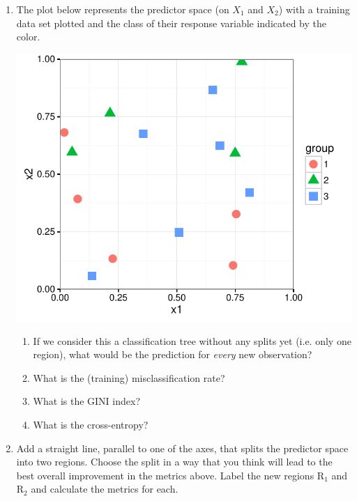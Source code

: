 \documentclass{article}\usepackage[]{graphicx}\usepackage[]{color}
\begin{document}
\begin{enumerate}
\setlength\itemsep{4em}

\item The plot below represents the predictor space (on $X_1$ and $X_2$) with a training data set plotted and the class of their response variable indicated by the color.

\begin{minipage}{.5\linewidth}
{\includegraphics[scale=0.6]{3-class-plot}}
\end{minipage}
\begin{minipage}{.5\linewidth}

\begin{enumerate}
\setlength\itemsep{3em}
\item If we consider this a classification tree without any splits yet (i.e. only one region), what would be the prediction for \emph{every} new observation?
\item What is the (training) misclassification rate?
\item What is the GINI index?
\item What is the cross-entropy?
\end{enumerate}

\end{minipage}

\item Add a straight line, parallel to one of the axes, that splits the predictor space into two regions. Choose the split in a way that you think will lead to the best overall improvement in the metrics above. Label the new regions $\textrm{R}_1$ and $\textrm{R}_2$ and calculate the metrics for each.


\end{enumerate}
\end{document}
